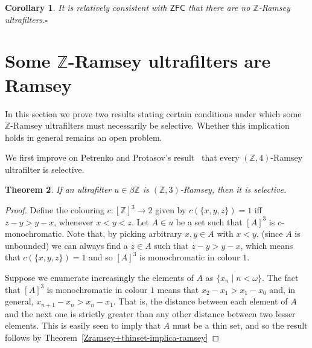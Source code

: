 \documentclass{amsart}
\newtheorem{theorem}{Theorem}[section]
\newtheorem{corollary}[theorem]{Corollary}
\theoremstyle{definition}
\newtheorem{definition}[theorem]{Definition}
\theoremstyle{remark}
\numberwithin{equation}{section}
\newcommand{\ZFC}{\mathsf{ZFC}}
\begin{document}
\begin{corollary}
    It is relatively consistent with $\ZFC$ that there are no $\mathbb Z$-Ramsey ultrafilters.\hfill $\square$
\end{corollary}

\section{Some \texorpdfstring{$\mathbb{Z}$}{Lg}-Ramsey ultrafilters are Ramsey}





In this section we prove two results stating certain conditions under which some $\mathbb Z$-Ramsey ultrafilters must necessarily be selective. Whether this implication holds in general remains an open problem.

We first improve on Petrenko and Protasov's result~\cite{MR3681104} that every $(\mathbb Z,4)$-Ramsey ultrafilter is selective.

\begin{theorem}\label{thm:z3impliesramsey}
    If an ultrafilter $u\in\beta\mathbb Z$ is $(\mathbb Z,3)$-Ramsey, then it is selective.
\end{theorem}

\begin{proof}
    Define the colouring $c:[\mathbb Z]^3\longrightarrow 2$ given by $c(\{x,y,z\})=1$ iff $z-y>y-x$, whenever $x<y<z$. Let $A\in u$ be a set such that $[A]^3$ is $c$-monochromatic. Note that, by picking arbitrary $x,y\in A$ with $x<y$, (since $A$ is unbounded) we can always find a $z\in A$ such that $z-y>y-x$, which means that $c(\{x,y,z\})=1$ and so $[A]^3$ is monochromatic in colour $1$.
    
    
    Suppose we enumerate increasingly the elements of $A$ as $\{x_n\mid n<\omega\}$. The fact that $[A]^3$ is monochromatic in colour $1$ means that $x_2-x_1>x_1-x_0$ and, in general, $x_{n+1}
    -x_n>x_n-x_1$. That is, the distance between each element of $A$ and the next one is strictly greater than any other distance between two lesser elements. This is easily seen to imply that $A$ must be a thin set, and so the result follows by Theorem~\ref{Zramsey+thinset-implica-ramsey}
\end{proof}
\end{document}
